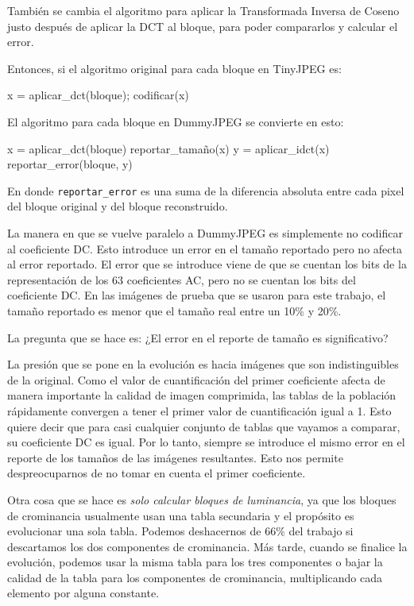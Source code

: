 También se cambia el algoritmo para aplicar la Transformada Inversa de Coseno
justo después de aplicar la DCT al bloque, para poder compararlos y calcular el
error.

Entonces, si el algoritmo original para cada bloque en TinyJPEG es:

\begin{code}
    x = aplicar_dct(bloque);
    codificar(x)
\end{code}

El algoritmo para cada bloque en DummyJPEG se convierte en esto:

\begin{code}
    x = aplicar_dct(bloque)
    reportar_tamaño(x)
    y = aplicar_idct(x)
    reportar_error(bloque, y)
\end{code}

En donde \verb+reportar_error+ es una suma de la diferencia absoluta entre cada
pixel del bloque original y del bloque reconstruido.

La manera en que se vuelve paralelo a DummyJPEG es simplemente no codificar al
coeficiente DC. Esto introduce un error en el tamaño reportado pero no afecta
al error reportado. El error que se introduce viene de que se cuentan los bits de
la representación de los 63 \gls{coeficientes AC}, pero no se cuentan los bits del
\gls{coeficiente DC}. En las imágenes de prueba que se usaron para este trabajo, el
tamaño reportado es menor que el tamaño real entre un 10\% y 20\%.

La pregunta que se hace es: ¿El error en el reporte de tamaño es significativo?

La presión que se pone en la evolución es hacia imágenes que son
indistinguibles de la original. Como el valor de cuantificación del primer
coeficiente afecta de manera importante la calidad de imagen comprimida, las
tablas de la población rápidamente convergen a tener el primer valor de
cuantificación igual a 1. Esto quiere decir que para casi cualquier conjunto de
tablas que vayamos a comparar, su coeficiente DC es igual. Por lo tanto,
siempre se introduce el mismo error en el reporte de los tamaños de las
imágenes resultantes. Esto nos permite despreocuparnos de no tomar en cuenta el
primer coeficiente.

Otra cosa que se hace es \emph{solo calcular bloques de luminancia}, ya que los
bloques de crominancia usualmente usan una tabla secundaria y el propósito es
evolucionar una sola tabla. Podemos deshacernos de $66\%$ del trabajo si
descartamos los dos componentes de crominancia. Más tarde, cuando se finalice
la evolución, podemos usar la misma tabla para los tres componentes o bajar la
calidad de la tabla para los componentes de crominancia, multiplicando cada
elemento por alguna constante.

